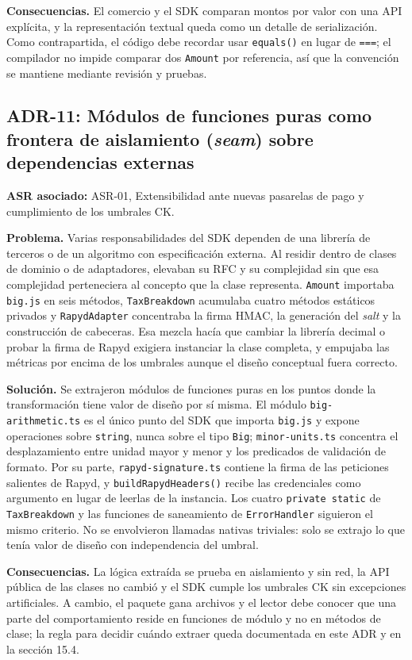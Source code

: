 \textbf{Consecuencias.} El comercio y el SDK comparan montos por valor con una API explícita, y la representación textual queda como un detalle de serialización. Como contrapartida, el código debe recordar usar \texttt{equals()} en lugar de \texttt{===}; el compilador no impide comparar dos \texttt{Amount} por referencia, así que la convención se mantiene mediante revisión y pruebas.

\subsection{ADR-11: Módulos de funciones puras como frontera de aislamiento (\textit{seam}) sobre dependencias externas}
\textbf{ASR asociado:} ASR-01, Extensibilidad ante nuevas pasarelas de pago y cumplimiento de los umbrales CK.

\textbf{Problema.} Varias responsabilidades del SDK dependen de una librería de terceros o de un algoritmo con especificación externa. Al residir dentro de clases de dominio o de adaptadores, elevaban su RFC y su complejidad sin que esa complejidad perteneciera al concepto que la clase representa. \texttt{Amount} importaba \texttt{big.js} en seis métodos, \texttt{TaxBreakdown} acumulaba cuatro métodos estáticos privados y \texttt{RapydAdapter} concentraba la firma HMAC, la generación del \textit{salt} y la construcción de cabeceras. Esa mezcla hacía que cambiar la librería decimal o probar la firma de Rapyd exigiera instanciar la clase completa, y empujaba las métricas por encima de los umbrales aunque el diseño conceptual fuera correcto.

\textbf{Solución.} Se extrajeron módulos de funciones puras en los puntos donde la transformación tiene valor de diseño por sí misma. El módulo \texttt{big-arithmetic.ts} es el único punto del SDK que importa \texttt{big.js} y expone operaciones sobre \texttt{string}, nunca sobre el tipo \texttt{Big}; \texttt{minor-units.ts} concentra el desplazamiento entre unidad mayor y menor y los predicados de validación de formato. Por su parte, \texttt{rapyd-signature.ts} contiene la firma de las peticiones salientes de Rapyd, y \texttt{buildRapydHeaders()} recibe las credenciales como argumento en lugar de leerlas de la instancia. Los cuatro \texttt{private static} de \texttt{TaxBreakdown} y las funciones de saneamiento de \texttt{ErrorHandler} siguieron el mismo criterio. No se envolvieron llamadas nativas triviales: solo se extrajo lo que tenía valor de diseño con independencia del umbral.

\textbf{Consecuencias.} La lógica extraída se prueba en aislamiento y sin red, la API pública de las clases no cambió y el SDK cumple los umbrales CK sin excepciones artificiales. A cambio, el paquete gana archivos y el lector debe conocer que una parte del comportamiento reside en funciones de módulo y no en métodos de clase; la regla para decidir cuándo extraer queda documentada en este ADR y en la sección 15.4.

